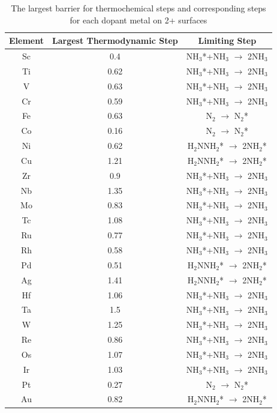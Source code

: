 \documentclass{article}
\begin{document}
\begin{table}
\begin{center}
\begin{tabular}{| c | c |c |}
\hline
Element & Largest Thermodynamic Step & Limiting Step \\
\hline
Sc & 0.4 & NH$_3$*+NH$_3$ $\rightarrow$ 2NH$_3$\\
Ti & 0.62 & NH$_3$*+NH$_3$ $\rightarrow$ 2NH$_3$\\
V & 0.63 & NH$_3$*+NH$_3$ $\rightarrow$ 2NH$_3$\\
Cr & 0.59 & NH$_3$*+NH$_3$ $\rightarrow$ 2NH$_3$\\
Fe & 0.63 & N$_2$ $\rightarrow$ N$_2$*\\
Co & 0.16 & N$_2$ $\rightarrow$ N$_2$*\\
Ni & 0.62 & H$_2$NNH$_2$* $\rightarrow$ 2NH$_2$*\\
Cu & 1.21 & H$_2$NNH$_2$* $\rightarrow$ 2NH$_2$*\\
Zr & 0.9 & NH$_3$*+NH$_3$ $\rightarrow$ 2NH$_3$\\
Nb & 1.35 & NH$_3$*+NH$_3$ $\rightarrow$ 2NH$_3$\\
Mo & 0.83 & NH$_3$*+NH$_3$ $\rightarrow$ 2NH$_3$\\
Tc & 1.08 & NH$_3$*+NH$_3$ $\rightarrow$ 2NH$_3$\\
Ru & 0.77 & NH$_3$*+NH$_3$ $\rightarrow$ 2NH$_3$\\
Rh & 0.58 & NH$_3$*+NH$_3$ $\rightarrow$ 2NH$_3$\\
Pd & 0.51 & H$_2$NNH$_2$* $\rightarrow$ 2NH$_2$*\\
Ag & 1.41 & H$_2$NNH$_2$* $\rightarrow$ 2NH$_2$*\\
Hf & 1.06 & NH$_3$*+NH$_3$ $\rightarrow$ 2NH$_3$\\
Ta & 1.5 & NH$_3$*+NH$_3$ $\rightarrow$ 2NH$_3$\\
W & 1.25 & NH$_3$*+NH$_3$ $\rightarrow$ 2NH$_3$\\
Re & 0.86 & NH$_3$*+NH$_3$ $\rightarrow$ 2NH$_3$\\
Os & 1.07 & NH$_3$*+NH$_3$ $\rightarrow$ 2NH$_3$\\
Ir & 1.03 & NH$_3$*+NH$_3$ $\rightarrow$ 2NH$_3$\\
Pt & 0.27 & N$_2$ $\rightarrow$ N$_2$*\\
Au & 0.82 & H$_2$NNH$_2$* $\rightarrow$ 2NH$_2$*\\
\hline
\end{tabular}
\end{center}
\caption{The largest barrier for thermochemical steps and corresponding steps for each dopant metal on 2+ surfaces}\label{table:thermo_limiting_steps}\end{table}\begin{table}

\end{table}
\end{document}
